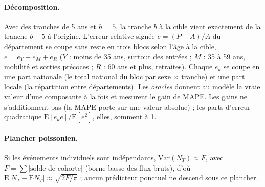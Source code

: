 \paragraph{Décomposition.} Avec des tranches de 5 ans et $h = 5$, la tranche $b$ à la cible vient exactement
de la tranche $b - 5$ à l'origine. L'erreur relative signée $e = (P - A)/A$ du département se coupe sans
reste en trois blocs selon l'âge à la cible, $e = e_Y + e_M + e_R$ ($Y$ : moins de 35 ans, surtout des
entrées ; $M$ : 35 à 59 ans, mobilité et sorties précoces ; $R$ : 60 ans et plus, retraites). Chaque $e_k$
se coupe en une part nationale (le total national du bloc par sexe $\times$ tranche) et une part locale (la
répartition entre départements). Les \emph{oracles} donnent au modèle la vraie valeur d'une composante à la
fois et mesurent le gain de MAPE. Les gains ne s'additionnent pas (la MAPE porte sur une valeur absolue) ; les
parts d'erreur quadratique $\mathrm E[e_k e]/\mathrm E[e^2]$, elles, somment à 1.

\paragraph{Plancher poissonien.} Si les événements individuels sont indépendants,
$\mathrm{Var}(N_T) \approx F$, avec $F = \sum |\text{solde de cohorte}|$ (borne basse des flux bruts), d'où
$\mathrm E|N_T - \mathrm E N_T| \approx \sqrt{2F/\pi}$ ; aucun prédicteur ponctuel ne descend sous ce plancher.

